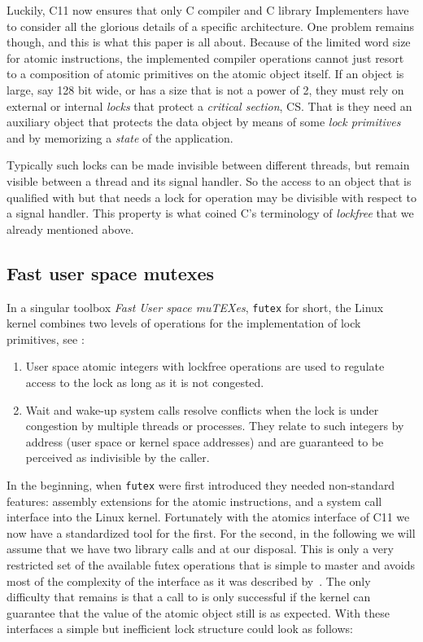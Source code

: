Luckily, C11 now ensures that only C compiler and C library
Implementers have to consider all the glorious details of a
specific architecture. One problem remains though, and this is what
this paper is all about. Because of the limited word size for
atomic instructions, the implemented compiler operations cannot just
resort to a composition of atomic primitives on the atomic object
itself. If an object is large, say 128 bit wide, or has a size that
is not a power of 2, they must rely on external or internal \emph{locks}
that protect a \emph{critical section}, CS. That is they need an
auxiliary object that protects the data object by means of some
\emph{lock primitives} and by memorizing a \emph{state} of the application.

Typically such locks can be made invisible between different
threads, but remain visible between a thread and its signal
handler. So the access to an object that is qualified with
 but that needs a lock for operation may be divisible with
respect to a signal handler. This property is what coined C's
terminology of \emph{lockfree} that we already mentioned above.

\subsection{Fast user space mutexes}
\label{sec-2-3}
\fi

In a singular toolbox \emph{Fast User space muTEXes}, \texttt{futex} for
short, the Linux kernel combines two levels of operations for the
implementation of lock primitives, see
\cite{Hutton02fuss,hart09}:
\iflong
\begin{enumerate}
\item User space atomic integers with lockfree operations are used to
regulate access to the lock as long as it is not congested.\itemadjust

\item Wait and wake-up system calls resolve conflicts when the lock is
under congestion by multiple threads or processes. They relate
to such integers by address (user space or kernel space
addresses) and are guaranteed to be perceived as indivisible by
the caller.\itemadjust
\end{enumerate}

In the beginning, when \texttt{futex} were first introduced they needed
non-standard features: assembly extensions for the atomic
instructions, and a system call interface into the Linux
kernel. Fortunately with the atomics interface of C11 we now have
a standardized tool for the first. For the second, in the
following we will assume that we have two library calls
 and  at our disposal.
%
This is only a very restricted set of the available futex operations that
is simple to master and avoids most of the complexity of the interface as
it was described by~\cite{drepper11:futex}. The only difficulty that
remains is that a call to  is only successful if the
kernel can guarantee that the value of the atomic object still is as
expected.
%
\fi
With these interfaces a simple but
inefficient lock structure  could look as follows:

